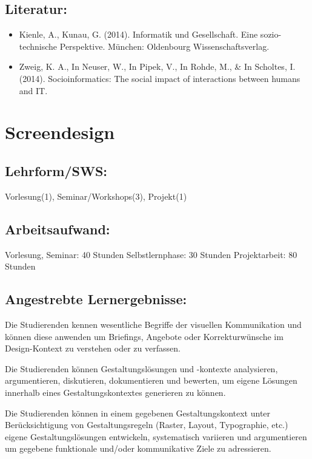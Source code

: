 \section{Literatur:}\label{literatur-24}

\begin{itemize}
\tightlist
\item
  Kienle, A., Kunau, G. (2014). Informatik und Gesellschaft. Eine
  sozio-technische Perspektive. München: Oldenbourg Wissenschaftsverlag.
\item
  Zweig, K. A., In Neuser, W., In Pipek, V., In Rohde, M., \& In
  Scholtes, I. (2014). Socioinformatics: The social impact of
  interactions between humans and IT.
\end{itemize}

\chapter{Screendesign}\label{screendesign}

\section{Lehrform/SWS:}\label{lehrformsws-20}

Vorlesung(1), Seminar/Workshops(3), Projekt(1)

\section{Arbeitsaufwand:}\label{arbeitsaufwand-20}

Vorlesung, Seminar: 40 Stunden Selbstlernphase: 30 Stunden
Projektarbeit: 80 Stunden

\section{Angestrebte
Lernergebnisse:}\label{angestrebte-lernergebnisse-25}

Die Studierenden kennen wesentliche Begriffe der visuellen Kommunikation
und können diese anwenden um Briefings, Angebote oder Korrekturwünsche
im Design-Kontext zu verstehen oder zu verfassen.

Die Studierenden können Gestaltungslösungen und -kontexte analysieren,
argumentieren, diskutieren, dokumentieren und bewerten, um eigene
Lösungen innerhalb eines Gestaltungskontextes generieren zu können.

Die Studierenden können in einem gegebenen Gestaltungskontext unter
Berücksichtigung von Gestaltungsregeln (Raster, Layout, Typographie,
etc.) eigene Gestaltungslösungen entwickeln, systematisch variieren und
argumentieren um gegebene funktionale und/oder kommunikative Ziele zu
adressieren.

